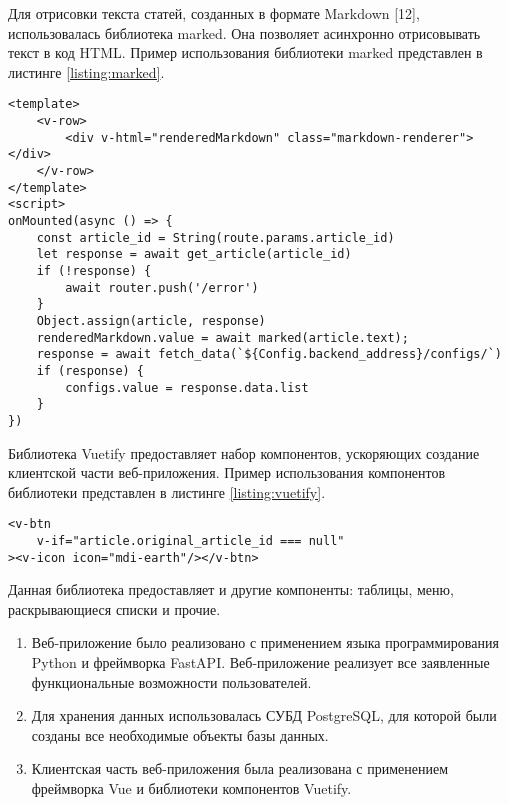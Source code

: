 Для отрисовки текста статей, созданных в формате Markdown [12], использовалась библиотека marked. Она позволяет асинхронно отрисовывать текст в код HTML. Пример использования библиотеки marked представлен в листинге \ref{listing:marked}.

\begin{lstlisting}[caption={Использование библиотеки marked}, label={listing:marked}]
<template>
    <v-row>
        <div v-html="renderedMarkdown" class="markdown-renderer"></div>
    </v-row>
</template>
<script>
onMounted(async () => {
    const article_id = String(route.params.article_id)
    let response = await get_article(article_id)
    if (!response) {
        await router.push('/error')
    }
    Object.assign(article, response)
    renderedMarkdown.value = await marked(article.text);
    response = await fetch_data(`${Config.backend_address}/configs/`)
    if (response) {
        configs.value = response.data.list
    }
})
\end{lstlisting}

Библиотека Vuetify предоставляет набор компонентов, ускоряющих создание клиентской части веб-приложения. Пример использования компонентов библиотеки представлен в листинге \ref{listing:vuetify}.

\begin{lstlisting}[caption={Использование компонентов из библиотеки Vuetify}, label={listing:vuetify}]
<v-btn
    v-if="article.original_article_id === null"
><v-icon icon="mdi-earth"/></v-btn>
\end{lstlisting}

Данная библиотека предоставляет и другие компоненты: таблицы, меню, раскрывающиеся списки и прочие.


\begin{enumerate}
    \item Веб-приложение было реализовано с применением языка программирования Python и фреймворка FastAPI. Веб-приложение реализует все заявленные функциональные возможности пользователей.
    \item Для хранения данных использовалась СУБД PostgreSQL, для которой были созданы все необходимые объекты базы данных.
    \item Клиентская часть веб-приложения была реализована с применением фреймворка Vue и библиотеки компонентов Vuetify.
\end{enumerate}
